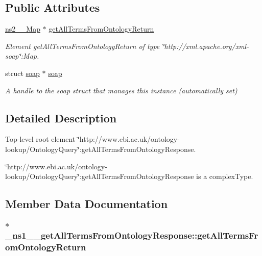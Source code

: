 \subsection*{Public Attributes}
\begin{DoxyCompactItemize}
\item 
\hyperlink{classns2____Map}{ns2\_\-\_\-Map} $\ast$ \hyperlink{class__ns1____getAllTermsFromOntologyResponse_a4fa860e8f24a889d7f0cf0a47f2681bc}{getAllTermsFromOntologyReturn}
\begin{DoxyCompactList}\small\item\em Element getAllTermsFromOntologyReturn of type \char`\"{}http://xml.apache.org/xml-\/soap\char`\"{}:Map. \end{DoxyCompactList}\item 
\hypertarget{class__ns1____getAllTermsFromOntologyResponse_abbd0cb17b1c938bef2b71f4248860d85}{
struct \hyperlink{class__ns1____getAllTermsFromOntologyResponse_abbd0cb17b1c938bef2b71f4248860d85}{soap} $\ast$ \hyperlink{class__ns1____getAllTermsFromOntologyResponse_abbd0cb17b1c938bef2b71f4248860d85}{soap}}
\label{class__ns1____getAllTermsFromOntologyResponse_abbd0cb17b1c938bef2b71f4248860d85}

\begin{DoxyCompactList}\small\item\em A handle to the soap struct that manages this instance (automatically set) \end{DoxyCompactList}\end{DoxyCompactItemize}


\subsection{Detailed Description}
Top-\/level root element \char`\"{}http://www.ebi.ac.uk/ontology-\/lookup/OntologyQuery\char`\"{}:getAllTermsFromOntologyResponse. 

\char`\"{}http://www.ebi.ac.uk/ontology-\/lookup/OntologyQuery\char`\"{}:getAllTermsFromOntologyResponse is a complexType. 

\subsection{Member Data Documentation}
\hypertarget{class__ns1____getAllTermsFromOntologyResponse_a4fa860e8f24a889d7f0cf0a47f2681bc}{
\subsubsection[{getAllTermsFromOntologyReturn}]{ $\ast$ {\bf \_\-ns1\_\-\_\-getAllTermsFromOntologyResponse::getAllTermsFromOntologyReturn}}}
\label{class__ns1____getAllTermsFromOntologyResponse_a4fa860e8f24a889d7f0cf0a47f2681bc}


